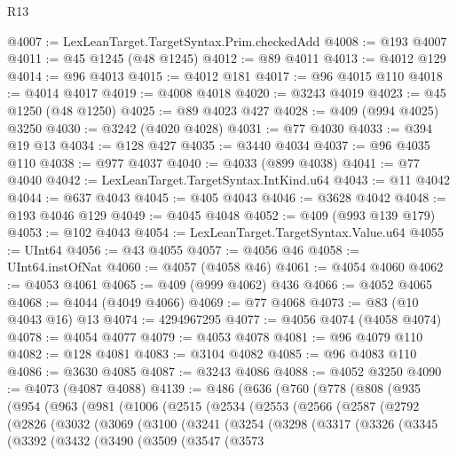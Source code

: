 \begin{lexlean}{R13}
\begin{coremodule}
@4007 := LexLeanTarget.TargetSyntax.Prim.checkedAdd
@4008 := @193 @4007
@4011 := @45 @1245 (@48 @1245)
@4012 := @89 @4011
@4013 := @4012 @129
@4014 := @96 @4013
@4015 := @4012 @181
@4017 := @96 @4015 @110
@4018 := @4014 @4017
@4019 := @4008 @4018
@4020 := @3243 @4019
@4023 := @45 @1250 (@48 @1250)
@4025 := @89 @4023 @427
@4028 := @409 (@994 @4025) @3250
@4030 := @3242 (@4020 @4028)
@4031 := @77 @4030
@4033 := @394 @19 @13
@4034 := @128 @427
@4035 := @3440 @4034
@4037 := @96 @4035 @110
@4038 := @977 @4037
@4040 := @4033 (@899 @4038)
@4041 := @77 @4040
@4042 := LexLeanTarget.TargetSyntax.IntKind.u64
@4043 := @11 @4042
@4044 := @637 @4043
@4045 := @405 @4043
@4046 := @3628 @4042
@4048 := @193 @4046 @129
@4049 := @4045 @4048
@4052 := @409 (@993 @139 @179)
@4053 := @102 @4043
@4054 := LexLeanTarget.TargetSyntax.Value.u64
@4055 := UInt64
@4056 := @43 @4055
@4057 := @4056 @46
@4058 := UInt64.instOfNat
@4060 := @4057 (@4058 @46)
@4061 := @4054 @4060
@4062 := @4053 @4061
@4065 := @409 (@999 @4062) @436
@4066 := @4052 @4065
@4068 := @4044 (@4049 @4066)
@4069 := @77 @4068
@4073 := @83 (@10 @4043 @16) @13
@4074 := 4294967295
@4077 := @4056 @4074 (@4058 @4074)
@4078 := @4054 @4077
@4079 := @4053 @4078
@4081 := @96 @4079 @110
@4082 := @128 @4081
@4083 := @3104 @4082
@4085 := @96 @4083 @110
@4086 := @3630 @4085
@4087 := @3243 @4086
@4088 := @4052 @3250
@4090 := @4073 (@4087 @4088)
@4139 := @486
    (@636
      (@760
        (@778
          (@808
            (@935
              (@954
                (@963
                  (@981
                    (@1006
                      (@2515
                        (@2534
                          (@2553
                            (@2566
                              (@2587
                                (@2792
                                  (@2826
                                    (@3032
                                      (@3069
                                        (@3100
                                          (@3241
                                            (@3254
                                              (@3298
                                                (@3317
                                                  (@3326
                                                    (@3345
                                                      (@3392
                                                        (@3432
                                                          (@3490
                                                            (@3509
                                                              (@3547
                                                                (@3573

\end{coremodule}
\end{lexlean}

